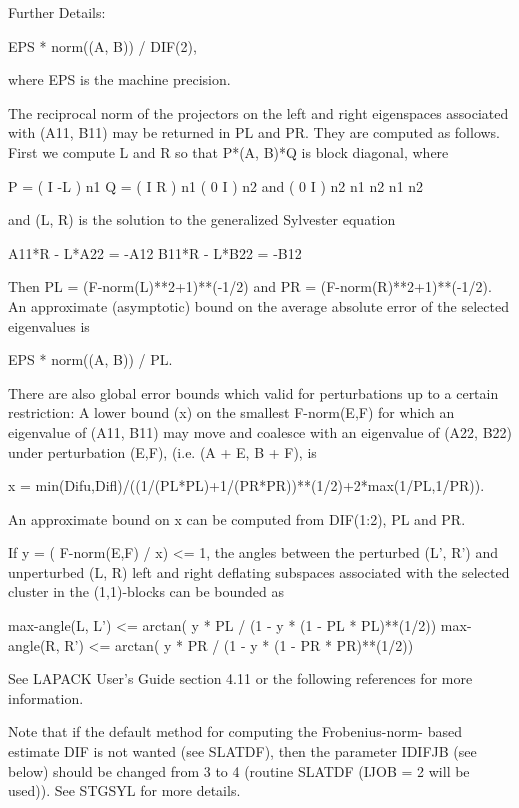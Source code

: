 \begin{DoxyParagraph}{Further Details\+: }
\begin{DoxyVerb}
       EPS * norm((A, B)) / DIF(2),

  where EPS is the machine precision.

  The reciprocal norm of the projectors on the left and right
  eigenspaces associated with (A11, B11) may be returned in PL and PR.
  They are computed as follows. First we compute L and R so that
  P*(A, B)*Q is block diagonal, where

       P = ( I -L ) n1           Q = ( I R ) n1
           ( 0  I ) n2    and        ( 0 I ) n2
             n1 n2                    n1 n2

  and (L, R) is the solution to the generalized Sylvester equation

       A11*R - L*A22 = -A12
       B11*R - L*B22 = -B12

  Then PL = (F-norm(L)**2+1)**(-1/2) and PR = (F-norm(R)**2+1)**(-1/2).
  An approximate (asymptotic) bound on the average absolute error of
  the selected eigenvalues is

       EPS * norm((A, B)) / PL.

  There are also global error bounds which valid for perturbations up
  to a certain restriction:  A lower bound (x) on the smallest
  F-norm(E,F) for which an eigenvalue of (A11, B11) may move and
  coalesce with an eigenvalue of (A22, B22) under perturbation (E,F),
  (i.e. (A + E, B + F), is

   x = min(Difu,Difl)/((1/(PL*PL)+1/(PR*PR))**(1/2)+2*max(1/PL,1/PR)).

  An approximate bound on x can be computed from DIF(1:2), PL and PR.

  If y = ( F-norm(E,F) / x) <= 1, the angles between the perturbed
  (L', R') and unperturbed (L, R) left and right deflating subspaces
  associated with the selected cluster in the (1,1)-blocks can be
  bounded as

   max-angle(L, L') <= arctan( y * PL / (1 - y * (1 - PL * PL)**(1/2))
   max-angle(R, R') <= arctan( y * PR / (1 - y * (1 - PR * PR)**(1/2))

  See LAPACK User's Guide section 4.11 or the following references
  for more information.

  Note that if the default method for computing the Frobenius-norm-
  based estimate DIF is not wanted (see SLATDF), then the parameter
  IDIFJB (see below) should be changed from 3 to 4 (routine SLATDF
  (IJOB = 2 will be used)). See STGSYL for more details.\end{DoxyVerb}
 
\end{DoxyParagraph}
